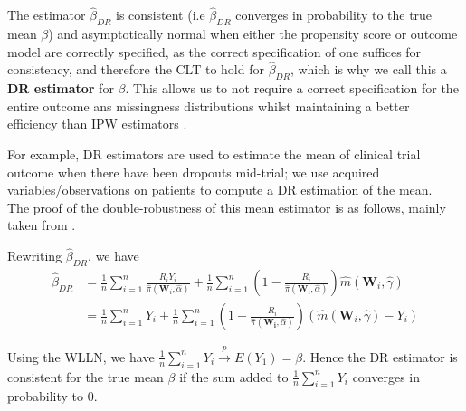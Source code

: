 \documentclass[12pt,twoside]{article}
\begin{document}
The estimator $\hat\beta_{DR}$ is consistent (i.e $\hat\beta_{DR}$ converges in probability to the true mean $\beta$) and asymptotically normal when either the propensity score or outcome model are correctly specified, as the correct specification of one suffices for consistency, and therefore the CLT to hold for $\hat\beta_{DR}$, which is why we call this a \textbf{DR estimator} for $\beta$. This allows us to not require a correct specification for the entire outcome ans missingness distributions whilst maintaining a better efficiency than IPW estimators \citep{bangrobins,vansteelandt}.

For example, DR estimators are used to estimate the mean of clinical trial outcome when there have been dropouts mid-trial; we use acquired variables/observations on patients to compute a DR estimation of the mean. \\

The proof of the double-robustness of this mean estimator is as follows, mainly taken from \citet{vansteelandt}.

Rewriting $\hat{\beta}_{DR}$, we have
\begin{align*}
    \hat{\beta}_{DR} & = \frac{1}{n}\sum_{i=1}^{n}\frac{R_iY_i}{\hat\pi(\mathbf{W}_i, \hat{\alpha})} + \frac{1}{n}\sum_{i=1}^{n} \left(1 - \frac{R_i}{\hat\pi(\mathbf{W_i},\hat{\alpha})} \right) \hat m(\mathbf{W}_i, \hat\gamma) \\
    & = \frac{1}{n}\sum_{i=1}^{n} Y_i + \frac{1}{n}\sum_{i=1}^{n}\left(1 - \frac{R_i}{\hat\pi(\mathbf{W_i},\hat{\alpha})} \right) (\hat m(\mathbf{W}_i, \hat\gamma)-Y_i)
\end{align*}

Using the WLLN, we have $\frac{1}{n}\sum_{i=1}^{n} Y_i\xrightarrow{p} E(Y_1) = \beta$. Hence the DR estimator is consistent for the true mean $\beta$ if the sum added to $\frac{1}{n}\sum_{i=1}^{n} Y_i$ converges in probability to 0. \\
\end{document}
